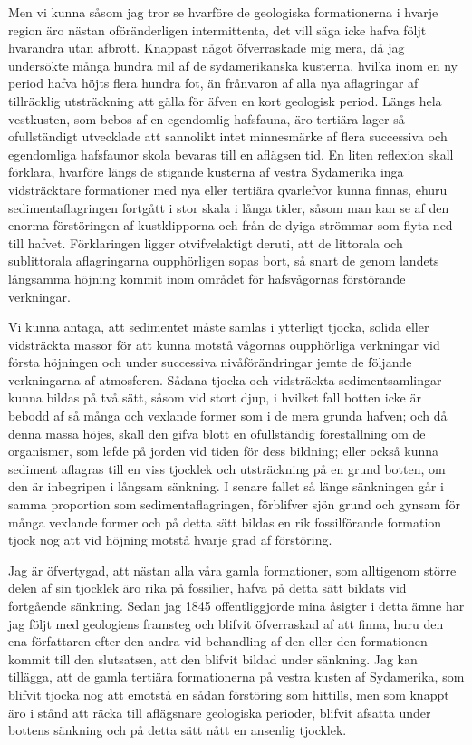 Men vi kunna såsom jag tror se hvarföre de geologiska formationerna i hvarje region äro nästan oföränderligen intermittenta, det vill säga icke hafva följt hvarandra utan afbrott. Knappast något öfverraskade mig mera, då jag undersökte många hundra mil af de sydamerikanska kusterna, hvilka inom en ny period hafva höjts flera hundra fot, än frånvaron af alla nya aflagringar af tillräcklig utsträckning att gälla för äfven en kort geologisk period. Längs hela vestkusten, som bebos af en egendomlig hafsfauna, äro tertiära lager så ofullständigt utvecklade att sannolikt intet minnesmärke af flera successiva och egendomliga hafsfaunor skola bevaras till en aflägsen tid. En liten reflexion skall förklara, hvarföre längs de stigande kusterna af vestra Sydamerika inga vidsträcktare formationer med nya eller tertiära qvarlefvor kunna finnas, ehuru sedimentaflagringen fortgått i stor skala i långa tider, såsom man kan se af den enorma förstöringen af kustklipporna och från de dyiga strömmar som flyta ned till hafvet. Förklaringen ligger otvifvelaktigt deruti, att de littorala och sublittorala aflagringarna oupphörligen sopas bort, så snart de genom landets långsamma höjning kommit inom området för hafsvågornas förstörande verkningar.

Vi kunna antaga, att sedimentet måste samlas i ytterligt tjocka, solida eller vidsträckta massor för att kunna motstå vågornas oupphörliga verkningar vid första höjningen och under successiva nivåförändringar jemte de följande verkningarna af atmosferen. Sådana tjocka och vidsträckta sedimentsamlingar kunna bildas på två sätt, såsom vid stort djup, i hvilket fall botten icke är bebodd af så många och vexlande former som i de mera grunda hafven; och då denna massa höjes, skall den gifva blott en ofullständig föreställning om de organismer, som lefde på jorden vid tiden för dess bildning; eller också kunna sediment aflagras till en viss tjocklek och utsträckning på en grund botten, om den är inbegripen i långsam sänkning. I senare fallet så länge sänkningen går i samma proportion som sedimentaflagringen, förblifver sjön grund och gynsam för många vexlande former och på detta sätt bildas en rik fossilförande formation tjock nog att vid höjning motstå hvarje grad af förstöring.

Jag är öfvertygad, att nästan alla våra gamla formationer, som alltigenom större delen af sin tjocklek äro rika på fossilier, hafva på detta sätt bildats vid fortgående sänkning. Sedan jag 1845 offentliggjorde mina åsigter i detta ämne har jag följt med geologiens framsteg och blifvit öfverraskad af att finna, huru den ena författaren efter den andra vid behandling af den eller den formationen kommit till den slutsatsen, att den blifvit bildad under sänkning. Jag kan tillägga, att de gamla tertiära formationerna på vestra kusten af Sydamerika, som blifvit tjocka nog att emotstå en sådan förstöring som hittills, men som knappt äro i stånd att räcka till aflägsnare geologiska perioder, blifvit afsatta under bottens sänkning och på detta sätt nått en ansenlig tjocklek.

